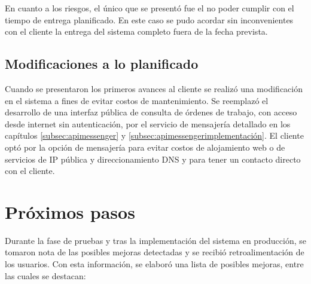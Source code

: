 En cuanto a los riesgos, el único que se presentó fue el no poder cumplir con el tiempo de entrega planificado. En este caso se pudo acordar sin inconvenientes con el cliente la entrega del sistema completo fuera de la fecha prevista. 

\subsection{Modificaciones a lo planificado}
Cuando se presentaron los primeros avances al cliente se realizó una modificación en el sistema a fines de evitar costos de mantenimiento. Se reemplazó el desarrollo de una interfaz pública de consulta de órdenes de trabajo, con acceso desde internet sin autenticación, por el servicio de mensajería detallado en los capítulos \ref{subsec:apimessenger} y \ref{subsec:apimessengerimplementación}. El cliente optó por la opción de mensajería para evitar costos de alojamiento web o de servicios de IP pública y direccionamiento DNS \cite{dns} y para tener un contacto directo con el cliente. 



\section{Próximos pasos}

Durante la fase de pruebas y tras la implementación del sistema en producción, se tomaron nota de las posibles mejoras detectadas y se recibió retroalimentación de los usuarios. Con esta información, se elaboró una lista de posibles mejoras, entre las cuales se destacan:

